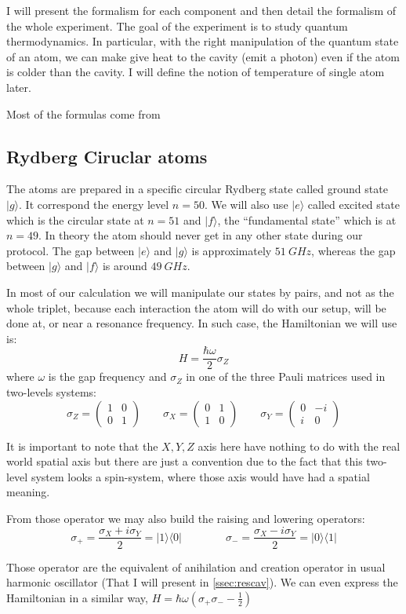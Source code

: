 \documentclass[10pt]{report}
\theoremstyle{plain}
\theoremstyle{definition}
\theoremstyle{remark}
\newcommand{\ket}[1]{|#1\rangle}
\newcommand{\bra}[1]{\langle#1|}
\newcommand{\mat}[1]{\begin{pmatrix}#1\end{pmatrix}}
\begin{document}
I will present the formalism for each component and then detail the formalism of
the whole experiment. The goal of the experiment is to study quantum
thermodynamics. In particular, with the right manipulation of the quantum state
of an atom, we can make give heat to the cavity (emit a photon) even if the atom
is colder than the cavity. I will define the notion of temperature of single
atom later.

Most of the formulas come from~\cite{Har06}


\subsection{Rydberg Ciruclar atoms}

The atoms are prepared in a specific circular Rydberg state called ground state
$\ket g$. It correspond the energy level $n = 50$. We will also use $\ket e$
called excited state which is the circular state at $n = 51$ and $\ket f$, the
``fundamental state'' which is at $n = 49$. In theory the atom should never get
in any other state during our protocol.
The gap between $\ket e$ and $\ket g$ is
approximately $\SI{51}{GHz}$, whereas the gap between $\ket g$ and $\ket f$ is
around $\SI{49}{GHz}$.

In most of our calculation we will manipulate our states by pairs, and not as the
whole triplet, because each interaction the atom will do with our setup, will be
done at, or near a resonance frequency. In such case, the Hamiltonian we will
use is:
\[H = \frac {\hbar \omega}2 \sigma_Z\]
 where $\omega$ is the gap frequency and $\sigma_Z$ in one of the
 three Pauli matrices used in two-levels systems:
\[\sigma_Z = \mat{1&0\\0&1} \quad \quad \sigma_X = \mat{0&1\\1&0} \quad \quad
  \sigma_Y = \mat{0&-i\\i&0}\]

It is important to note that the $X,Y,Z$ axis here have nothing to do with the
real world spatial axis but there are just a convention due to the fact that
this two-level system looks a spin-system, where those axis would have had a
spatial meaning.

From those operator we may also build the raising and lowering operators:
\[\sigma_+ = \frac{\sigma_X + i \sigma_Y}2 = \ket 1 \bra 0 \quad \quad \quad \quad
  \sigma_- = \frac{\sigma_X - i \sigma_Y}2 = \ket 0 \bra 1\]

Those operator are the equivalent of anihilation and creation operator in usual
harmonic oscillator (That I will present in \cref{ssec:rescav}). We can even
express the Hamiltonian in a similar way, $H = \hbar \omega(\sigma_+\sigma_- - \frac12)$
\end{document}
